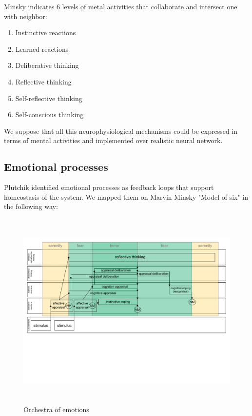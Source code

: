 Minsky indicates 6 levels of metal activities that collaborate and intersect one with neighbor:

\begin{enumerate}
 \item  Instinctive reactions
 \item  Learned reactions
 \item  Deliberative thinking
 \item  Reflective thinking
 \item  Self-reflective thinking
 \item  Self-conscious thinking
\end{enumerate}

We suppose that all this neurophysiological mechanisms could be expressed in terms of mental activities and implemented over realistic neural network.

\subsection{Emotional processes}

Plutchik identified emotional processes as feedback loops \cite{natureofemotions} that support homeostasis of the system. We mapped them on Marvin Minsky "Model of six" in the following way:

\begin{figure}
\begin{center}
 \includegraphics[height=10cm, angle=90]{figure2_orchestra_of_emotions}
\end{center}
\caption{Orchestra of emotions}
\label{figure2_orchestra_of_emotions}
\end{figure}

